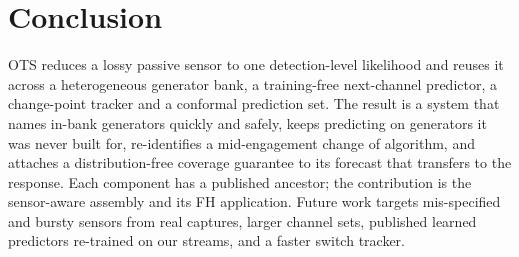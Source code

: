 \documentclass[conference]{IEEEtran}
\begin{document}
\section{Conclusion}
OTS reduces a lossy passive sensor to one detection-level likelihood and reuses
it across a heterogeneous generator bank, a training-free next-channel
predictor, a change-point tracker and a conformal prediction set. The result is
a system that names in-bank generators quickly and safely, keeps predicting on
generators it was never built for, re-identifies a mid-engagement change of
algorithm, and attaches a distribution-free coverage guarantee to its forecast
that transfers to the response. Each component has a published ancestor; the
contribution is the sensor-aware assembly and its FH application. Future work
targets mis-specified and bursty sensors from real captures, larger channel
sets, published learned predictors re-trained on our streams, and a faster
switch tracker.
\end{document}
